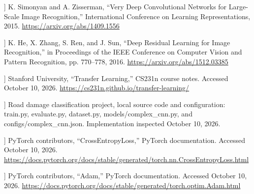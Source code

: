 \documentclass[11pt,a4paper]{article}
\begin{document}
\begin{list}{}{\setlength{\leftmargin}{2.5em}\setlength{\labelwidth}{2em}\setlength{\labelsep}{0.5em}\setlength{\itemsep}{0.5em}}
\item[[9]] K. Simonyan and A. Zisserman, ``Very Deep Convolutional Networks for Large-Scale Image Recognition,'' International Conference on Learning Representations, 2015.
\url{https://arxiv.org/abs/1409.1556}

\item[[10]] K. He, X. Zhang, S. Ren, and J. Sun, ``Deep Residual Learning for Image Recognition,'' in Proceedings of the IEEE Conference on Computer Vision and Pattern Recognition, pp. 770--778, 2016.
\url{https://arxiv.org/abs/1512.03385}

\item[[11]] Stanford University, ``Transfer Learning,'' CS231n course notes. Accessed October 10, 2026.
\url{https://cs231n.github.io/transfer-learning/}

\item[[12]] Road damage classification project, local source code and configuration: train.py, evaluate.py, dataset.py, models/complex\_cnn.py, and configs/complex\_cnn.json. Implementation inspected October 10, 2026.

\item[[13]] PyTorch contributors, ``CrossEntropyLoss,'' PyTorch documentation. Accessed October 10, 2026.
\url{https://docs.pytorch.org/docs/stable/generated/torch.nn.CrossEntropyLoss.html}

\item[[14]] PyTorch contributors, ``Adam,'' PyTorch documentation. Accessed October 10, 2026.
\url{https://docs.pytorch.org/docs/stable/generated/torch.optim.Adam.html}

\end{list}

\endgroup
\end{document}
